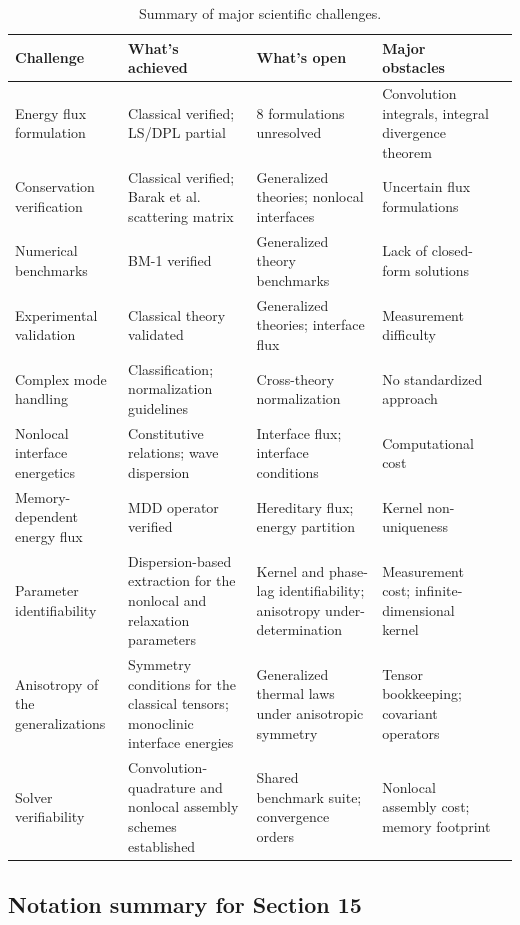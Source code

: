 \begin{table}[h]
\centering
\small
\caption{Summary of major scientific challenges.}
\label{tab:challenges_summary}
\begin{tabularx}{\textwidth}{@{}lXXXX@{}}
\toprule
\textbf{Challenge} & \textbf{What's achieved} & \textbf{What's open} & \textbf{Major obstacles} \\
\midrule
Energy flux formulation & Classical verified; LS/DPL partial & 8 formulations unresolved & Convolution integrals, integral divergence theorem \\
Conservation verification & Classical verified; Barak et al.~\cite{Barak2023} scattering matrix & Generalized theories; nonlocal interfaces & Uncertain flux formulations \\
Numerical benchmarks & BM-1 verified & Generalized theory benchmarks & Lack of closed-form solutions \\
Experimental validation & Classical theory validated & Generalized theories; interface flux & Measurement difficulty \\
Complex mode handling & Classification; normalization guidelines & Cross-theory normalization & No standardized approach \\
Nonlocal interface energetics & Constitutive relations; wave dispersion & Interface flux; interface conditions & Computational cost \\
Memory-dependent energy flux & MDD operator verified & Hereditary flux; energy partition & Kernel non-uniqueness \\
Parameter identifiability & Dispersion-based extraction for the nonlocal and relaxation parameters & Kernel and phase-lag identifiability; anisotropy under-determination & Measurement cost; infinite-dimensional kernel \\ 
Anisotropy of the generalizations & Symmetry conditions for the classical tensors; monoclinic interface energies & Generalized thermal laws under anisotropic symmetry & Tensor bookkeeping; covariant operators \\ 
Solver verifiability & Convolution-quadrature and nonlocal assembly schemes established & Shared benchmark suite; convergence orders & Nonlocal assembly cost; memory footprint \\
\bottomrule
\end{tabularx}
\end{table}

\subsection{Notation summary for Section 15}

